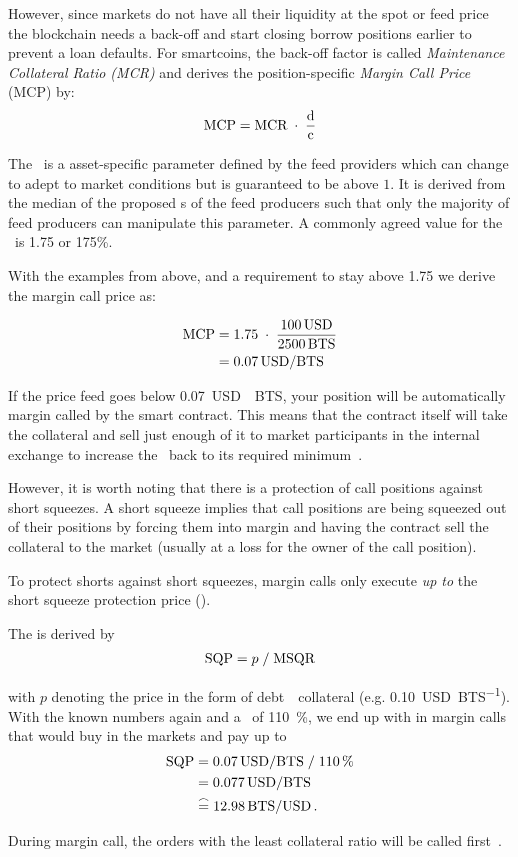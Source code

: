 \label{sec:margincall}

However, since markets do not have all their liquidity at the spot or feed
price the blockchain needs a back-off and start closing borrow positions
earlier to prevent a loan defaults. For smartcoins, the back-off factor is
called \emph{Maintenance Collateral Ratio (MCR)} and derives the
position-specific \emph{Margin Call Price} (MCP) by:
\begin{align}
 \text{MCP} = \text{MCR} \;\cdot\; \frac{\text{d}}{\text{c}}
\end{align}

The \MCR\ is a asset-specific parameter defined by the feed providers which can
change to adept to market conditions but is guaranteed to be above $1$. It is
derived from the median of the proposed \MCR s of the feed producers such that
only the majority of feed producers can manipulate this parameter. A commonly
agreed value for the \MCR\ is \num{1.75} or 175\%.

With the examples from above, and a requirement to stay above \num{1.75} we
derive the margin call price as:

\begin{align}
 \text{MCP} &= 1.75 \;\cdot\; \frac{\SI{100}{USD}}{\SI{2500}{BTS}} \\
      &= \SI{0.07}{USD \per BTS}
\end{align}

If the price feed goes below \SI{0.07}{USD \per BTS}, your position will be
automatically margin called by the smart contract. This means that the contract
itself will take the collateral and sell just enough of it to market
participants in the internal exchange to increase the \MCR\ back to its
required minimum~\cite{bsip31}.

However, it is worth noting that there is a protection of call positions
against short squeezes. A short squeeze implies that call positions are being
squeezed out of their positions by forcing them into margin and having the
contract sell the collateral to the market (usually at a loss for the owner of
the call position).

To protect shorts against short squeezes, margin calls only execute
\emph{up to} the short squeeze protection price (\SQP).

The \SQP is derived by
\begin{align}
 \text{SQP} = p \;/\; \text{MSQR}
\end{align}

with $p$ denoting the price in the form of \si{debt \per collateral} (e.g.
\SI{0.10}{USD\per BTS}). With the known numbers again and a \MSQR\ of
\SI{110}{\percent}, we end up with in margin calls that would buy in the
markets and pay up to
\begin{align}
 \text{SQP} &= \SI{0.07}{USD \per BTS} \;/\; \SI{110}{\percent} \\
      &= \SI{0.077}{USD \per BTS} \\
      &\stackrel{\frown}{=} \SI{12.98}{BTS \per USD}\,.
\end{align}

During margin call, the orders with the least collateral ratio will be called
first~\cite{bsip34}.
